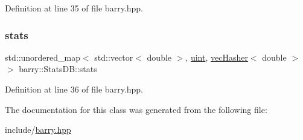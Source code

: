 Definition at line 35 of file barry.\+hpp.

\mbox{\label{classbarry_1_1_stats_d_b_a37af92a5d40cd2582446d86209ea7f26}} 
\subsubsection{\texorpdfstring{stats}{stats}}
{\footnotesize\ttfamily std\+::unordered\+\_\+map$<$ std\+::vector$<$ double $>$, \hyperlink{namespacebarry_a11dfc53ddb4672278319aa04f1e09a6c}{uint}, \hyperlink{structbarry_1_1vec_hasher}{vec\+Hasher}$<$ double $>$ $>$ barry\+::\+Stats\+D\+B\+::stats}



Definition at line 36 of file barry.\+hpp.



The documentation for this class was generated from the following file\+:\begin{DoxyCompactItemize}
\item 
include/\hyperlink{barry_8hpp}{barry.\+hpp}\end{DoxyCompactItemize}
